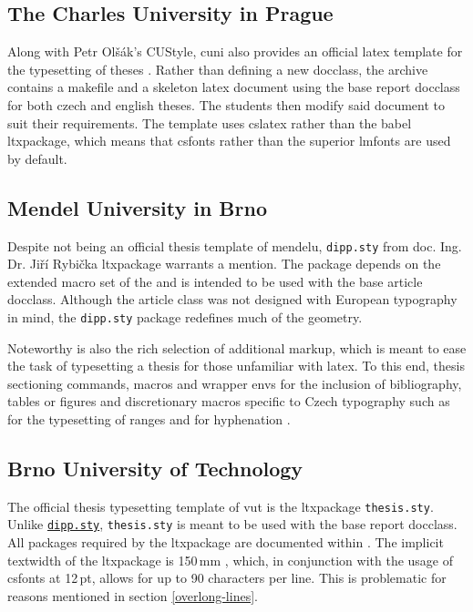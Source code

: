    \subsection{The Charles University in Prague}
    Along with Petr Olšák's CUStyle, \gls{cuni} also provides an official \gls{latex} template for the typesetting of theses \cite{cunisablona}. Rather than defining a new \gls{docclass}, the archive contains a \gls{makefile} and a skeleton \gls{latex} document using the base report \gls{docclass} for both czech and english theses. The students then modify said document to suit their requirements. The template uses \gls{cslatex} rather than the babel \gls{ltxpackage}, which means that \gls{csfonts} rather than the superior \gls{lmfonts} \cite{cslatexvsbabel} are used by default.

    \subsection{Mendel University in Brno}\label{sec:dipp.sty}
    Despite not being an official thesis template of \gls{mendelu}, \texttt{dipp.sty} from doc. Ing. Dr. Jiří Rybička \gls{ltxpackage} warrants a mention. The package depends on the extended macro set of the   and is intended to be used with the base article \gls{docclass}. Although the article class was not designed with European typography in mind, the \texttt{dipp.sty} package redefines much of the geometry.

    Noteworthy is also the rich selection of additional markup, which is meant to ease the task of typesetting a thesis for those unfamiliar with \gls{latex}. To this end, thesis sectioning commands, macros and wrapper \glspl{env} for the inclusion of bibliography, tables or figures and discretionary macros specific to Czech typography such as  for the typesetting of ranges and  for hyphenation \cite{dippman}.

    \subsection{Brno University of Technology}
    The official thesis typesetting template of \gls{vut} is the \gls{ltxpackage} \texttt{thesis.sty}. Unlike \texttt{\hyperref[sec:dipp.sty]{\tt dipp.sty}}, \texttt{thesis.sty} is meant to be used with the base report \gls{docclass}. All packages required by the \gls{ltxpackage} are documented within \cite[p.~9]{thesis.sty-doc} \pending{}. The implicit \gls{textwidth} of the \gls{ltxpackage} is 150\,mm \cite[p.~2]{thesis.sty-doc}, which, in conjunction with the usage of \gls{csfonts} at 12\,pt, allows for up to 90 characters per line. This is problematic for reasons mentioned in section \ref{overlong-lines}.
    
